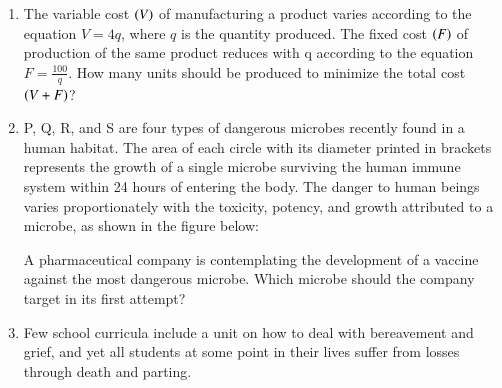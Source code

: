 \documentclass[journal,12pt,onecolumn]{IEEEtran}
\theoremstyle{remark}
\begin{document}
\begin{enumerate}
\begin{enumerate}
\end{enumerate}
\item The variable cost $\left(V\right)$ of manufacturing a product varies according to the equation $V = 4q$, where $q$ is the quantity produced. The fixed cost $\left(F\right)$ of production of the same product reduces with q according to the equation $F = \frac{100}{q}$. How many units should be produced to minimize the total cost $\left(V+F\right)$?
\begin{enumerate}
\end{enumerate}
\item P, Q, R, and S are four types of dangerous microbes recently found in a human habitat. The area of each circle with its diameter printed in brackets represents the growth of a single microbe surviving the human immune system within 24 hours of entering the body. The danger to human beings varies proportionately with the toxicity, potency, and growth attributed to a microbe, as shown in the figure below:
\begin{figure}[H]
\centering

\end{figure}
A pharmaceutical company is contemplating the development of a vaccine against the most dangerous microbe. Which microbe should the company target in its first attempt?
\begin{enumerate}
\end{enumerate}
\item Few school curricula include a unit on how to deal with bereavement and grief, and yet all students at some point in their lives suffer from losses through death and parting.\\

\end{enumerate}
\end{document}
